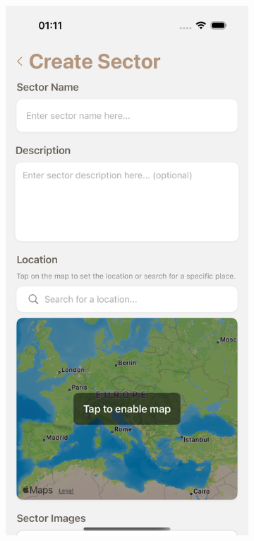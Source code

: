\begin{figure}[H]
    \centering
    \begin{subfigure}[b]{0.36\textwidth}
        \centering
        \includegraphics[width=\textwidth]{images/implementacija/editing-options/create-sector.png}

\end{subfigure}
\end{figure}
